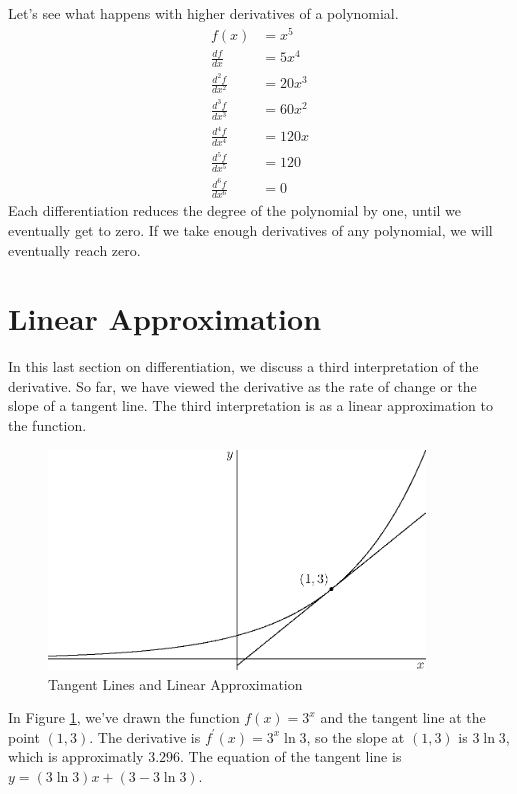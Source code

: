 \documentclass[fleqn]{report}
\begin{document}
\begin{example}
Let's see what happens with higher derivatives of a
polynomial. 
\begin{align*}
f(x) & = x^5 \\
\frac{df}{dx} & = 5x^4 \\
\frac{d^2f}{dx^2} & = 20x^3 \\
\frac{d^3f}{dx^3} & = 60x^2 \\
\frac{d^4f}{dx^4} & = 120x \\
\frac{d^5f}{dx^5} & = 120 \\
\frac{d^6f}{dx^6} & = 0 
\end{align*}
Each differentiation reduces the degree of the polynomial by
one, until we eventually get to zero. If we take enough
derivatives of any polynomial, we will eventually reach zero.
\end{example}

\section{Linear Approximation}
\label{linear-approximation}

In this last section on differentiation, we discuss a third
interpretation of the derivative. So far, we have viewed the 
derivative as the rate of change or the slope of a tangent line.
The third interpretation is as a linear approximation to the
function. 

\begin{figure}[ht]
\centering
\includegraphics[width=10cm]{figure51.eps}
\caption{Tangent Lines and Linear Approximation}
\label{figure-linear-approximation}
\end{figure}

In Figure \ref{figure-linear-approximation}, we've
drawn the function $f(x) = 3^x$ and the tangent line at the
point $(1,3)$. The derivative is $f^\prime(x) = 3^x \ln 3$, so
the slope at $(1,3)$ is $3 \ln 3$, which is approximatly
$3.296$. The equation of the tangent line is $y = (3 \ln 3) x
+ (3 - 3 \ln 3)$. 
\end{document}
